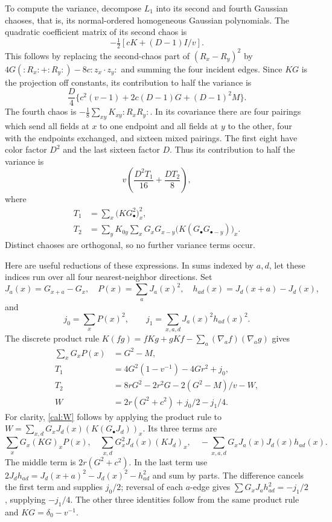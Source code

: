 To compute the variance, decompose $L_1$ into its second and fourth
Gaussian chaoses, that is, its normal-ordered homogeneous Gaussian
polynomials. The quadratic coefficient matrix of its second chaos is
\[
 -\tfrac12[cK+(D-1)I/v].
\]
This follows by replacing the second-chaos part of
$(R_x-R_y)^2$ by
$4G(:R_x:+:R_y:)-8c:z_x\cdot z_y:$ and summing the four incident edges.
Since $KG$ is the projection off constants, its contribution to half
the variance is
\begin{equation}
\label{cal:chaos2}
 \frac D4\{c^2(v-1)+2c(D-1)G+(D-1)^2M\}.
\end{equation}
The fourth chaos is $-\frac18\sum_{xy}K_{xy}:R_xR_y:$.
In its covariance there are four pairings which send all fields at
$x$ to one endpoint and all fields at $y$ to the other, four with the
endpoints exchanged, and sixteen mixed pairings. The first eight have
color factor $D^2$ and the last sixteen factor $D$. Thus its
contribution to half the variance is
\begin{equation}
\label{cal:chaos4}
 v\left(\frac{D^2T_1}{16}+\frac{DT_2}{8}\right),
\end{equation}
where
\begin{align*}
 T_1&=\sum_x\bigl(KG_\bullet^2\bigr)_x^2,\\
 T_2&=\sum_yK_{0y}\sum_xG_xG_{x-y}
                         \bigl(K(G_\bullet G_{\bullet-y})\bigr)_x.
\end{align*}
Distinct chaoses are orthogonal, so no further variance terms occur.

Here are useful reductions of these expressions. In sums indexed by
$a,d$, let these indices run over all four nearest-neighbor directions.
Set
\[
 J_a(x)=G_{x+a}-G_x,\quad P(x)=\sum_aJ_a(x)^2,
 \quad h_{ad}(x)=J_d(x+a)-J_d(x),
\]
and
\[
 j_0=\sum_xP(x)^2,\qquad
 j_1=\sum_{x,a,d}J_a(x)^2h_{ad}(x)^2.
\]
The discrete product rule
$K(fg)=fKg+gKf-\sum_a(\nabla_af)(\nabla_ag)$ gives
\begin{align}
 \sum_xG_xP(x)&=G^2-M,\label{cal:GP}\\
 T_1&=4G^2(1-v^{-1})-4Gr^2+j_0,\label{cal:T1}\\
 T_2&=8rG^2-2r^2G-2(G^2-M)/v-W,\label{cal:T2}\\
 W&=2r(G^2+c^2)+j_0/2-j_1/4.\label{cal:W}
\end{align}
For clarity, \eqref{cal:W} follows by applying the product rule to
$W=\sum_{x,d}G_xJ_d(x)(K(G_\bullet J_d))_x$.
Its three terms are
\[
 \sum_xG_x(KG)_xP(x),\quad
 \sum_{x,d}G_x^2J_d(x)(KJ_d)_x,
 \quad-\sum_{x,a,d}G_xJ_a(x)J_d(x)h_{ad}(x).
\]
The middle term is $2r(G^2+c^2)$. In the last term use
$2J_dh_{ad}=J_d(x+a)^2-J_d(x)^2-h_{ad}^2$ and sum by parts.
The difference cancels the first term and supplies $j_0/2$;
reversal of each $a$-edge gives
$\sum G_xJ_a h_{ad}^2=-j_1/2$, supplying $-j_1/4$.
The other three identities follow from the same product rule and
$KG=\delta_0-v^{-1}$.

